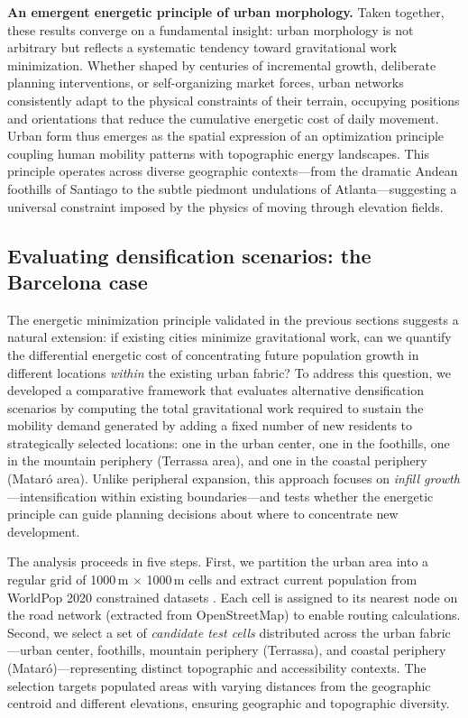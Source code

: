 \documentclass[twocolumn,amsmath,amssymb,floatfix,nature,shownopacs,footinbib,superscriptaddress]{revtex4-1} %
\begin{document}
\vspace{0.5em}
\noindent\textbf{An emergent energetic principle of urban morphology.}  
Taken together, these results converge on a fundamental insight:  
urban morphology is not arbitrary but reflects a systematic tendency toward gravitational work minimization.  
Whether shaped by centuries of incremental growth, deliberate planning interventions, or self-organizing market forces, urban networks consistently adapt to the physical constraints of their terrain, occupying positions and orientations that reduce the cumulative energetic cost of daily movement.  
Urban form thus emerges as the spatial expression of an optimization principle coupling human mobility patterns with topographic energy landscapes.  
This principle operates across diverse geographic contexts—from the dramatic Andean foothills of Santiago to the subtle piedmont undulations of Atlanta—suggesting a universal constraint imposed by the physics of moving through elevation fields.

\vspace{0.5em}

\subsection*{Evaluating densification scenarios: the Barcelona case}

The energetic minimization principle validated in the previous sections suggests a natural extension: if existing cities minimize gravitational work, can we quantify the differential energetic cost of concentrating future population growth in different locations \emph{within} the existing urban fabric?  
To address this question, we developed a comparative framework that evaluates alternative densification scenarios by computing the total gravitational work required to sustain the mobility demand generated by adding a fixed number of new residents to strategically selected locations: one in the urban center, one in the foothills, one in the mountain periphery (Terrassa area), and one in the coastal periphery (Mataró area).  
Unlike peripheral expansion, this approach focuses on \emph{infill growth}—intensification within existing boundaries—and tests whether the energetic principle can guide planning decisions about where to concentrate new development.

The analysis proceeds in five steps.  
First, we partition the urban area into a regular grid of 1000\,m $\times$ 1000\,m cells and extract current population from WorldPop 2020 constrained datasets \cite{worldpop}.  
Each cell is assigned to its nearest node on the road network (extracted from OpenStreetMap) to enable routing calculations.  
Second, we select a set of \emph{candidate test cells} distributed across the urban fabric—urban center, foothills, mountain periphery (Terrassa), and coastal periphery (Mataró)—representing distinct topographic and accessibility contexts.  
The selection targets populated areas with varying distances from the geographic centroid and different elevations, ensuring geographic and topographic diversity.
\end{document}
